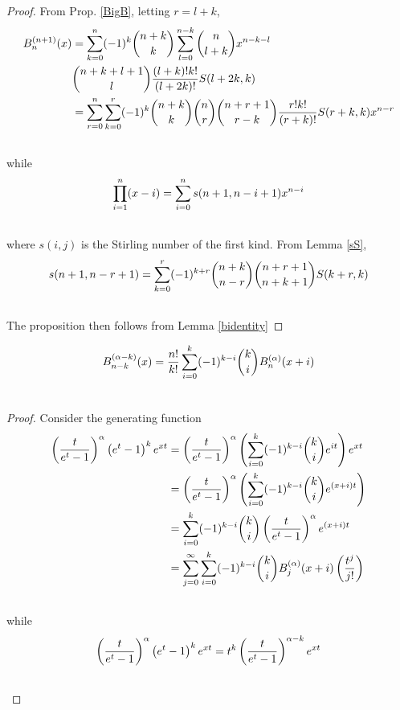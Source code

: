 \documentclass[fleqn,a4paper,9pt]{article}
\begin{document}
\begin{flushleft}
\begin{proof}
From Prop. \ref{BigB}, letting $r=l+k$,
\begin{align}
B_n^{(n+1)}(x)&=\sum_{k=0}^n (-1)^k\binom{n+k}{k}\sum_{l=0}^{n-k}\binom{n}{l+k}x^{n-k-l}\\\notag
&\binom{n+k+l+1}{l}\frac{(l+k)!k!}{(l+2k)!}S(l+2k,k)\\\notag
&=\sum_{r=0}^n\sum_{k=0}^r(-1)^k\binom{n+k}{k}\binom{n}{r}\binom{n+r+1}{r-k}\frac{r!k!}{(r+k)!}S(r+k,k)x^{n-r}\\\notag
\end{align}
while
\begin{align}
\prod_{i=1}^{n}(x-i)&=\sum_{i=0}^n s(n+1,n-i+1)x^{n-i}\\\notag
\end{align}
where $s(i,j)$ is the Stirling number  of the first kind.
From Lemma \ref{sS},
\begin{align}
s(n+1,n-r+1)&=\sum_{k=0}^{r}(-1)^{k+r}\binom{n+k}{n-r}\binom{n+r+1}{n+k+1}S(k+r,k)\\\notag
\end{align}
The proposition then follows from Lemma \ref{bidentity}
\end{proof}
\begin{proposition}
\begin{align}
B_{n-k}^{(\alpha-k)}(x)=\frac{n!}{k!}\sum_{i=0}^k(-1)^{k-i} \binom{k}{i}B_n^{(\alpha)}(x+i)\\\notag
\end{align}
\end{proposition}
\begin{proof}
Consider the generating function
\begin{align}
\left(\frac{t}{e^t-1}\right)^\alpha\left(e^t-1\right)^k e^{xt}&=\left(\frac{t}{e^t-1}\right)^\alpha\left(\sum_{i=0}^k (-1)^{k-i}\binom{k}{i}e^{it}\right)e^{xt}\\\notag
&=\left(\frac{t}{e^t-1}\right)^\alpha\left(\sum_{i=0}^k(-1)^{k-i} \binom{k}{i}e^{(x+i)t}\right)\\\notag
&=\sum_{i=0}^k(-1)^{k-i} \binom{k}{i}\left(\frac{t}{e^t-1}\right)^\alpha e^{(x+i)t}\\\notag
&=\sum_{j=0}^\infty\sum_{i=0}^k(-1)^{k-i} \binom{k}{i}B_j^{(\alpha)}(x+i)\left(\frac{t^j}{j!}\right)\\\notag
\end{align}
while
\begin{align}
\left(\frac{t}{e^t-1}\right)^\alpha\left(e^t-1\right)^k e^{xt}&=t^k\left(\frac{t}{e^t-1}\right)^{\alpha-k}e^{xt}\\\notag

\end{align}
\end{proof}
\end{flushleft}
\end{document}
